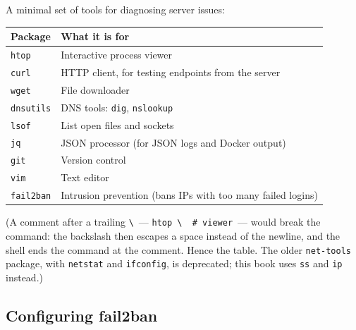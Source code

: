 A minimal set of tools for diagnosing server issues:

\begin{codebox}[short]

\begin{Shaded}
\begin{Highlighting}[]
\end{Highlighting}
\end{Shaded}

\end{codebox}


{\def\LTcaptype{none} %
\begin{longtable}[]{@{}ll@{}}
\toprule\noalign{}
Package & What it is for \\
\midrule\noalign{}
\endhead
\bottomrule\noalign{}
\endlastfoot
\texttt{htop} & Interactive process viewer \\
\texttt{curl} & HTTP client, for testing endpoints from the server \\
\texttt{wget} & File downloader \\
\texttt{dnsutils} & DNS tools: \texttt{dig}, \texttt{nslookup} \\
\texttt{lsof} & List open files and sockets \\
\texttt{jq} & JSON processor (for JSON logs and Docker output) \\
\texttt{git} & Version control \\
\texttt{vim} & Text editor \\
\texttt{fail2ban} & Intrusion prevention (bans IPs with too many failed logins) \\
\end{longtable}
}

(A comment after a trailing \texttt{\textbackslash{}}~--- \texttt{htop\ \textbackslash{}\ \ \#\ viewer}~--- would break the command: the backslash then escapes a space instead of the newline, and the shell ends the command at the comment. Hence the table. The older \texttt{net-tools} package, with \texttt{netstat} and \texttt{ifconfig}, is deprecated; this book uses \texttt{ss} and \texttt{ip} instead.)

\subsection*{Configuring fail2ban}\label{21-system-setup:configuring-fail2ban}

